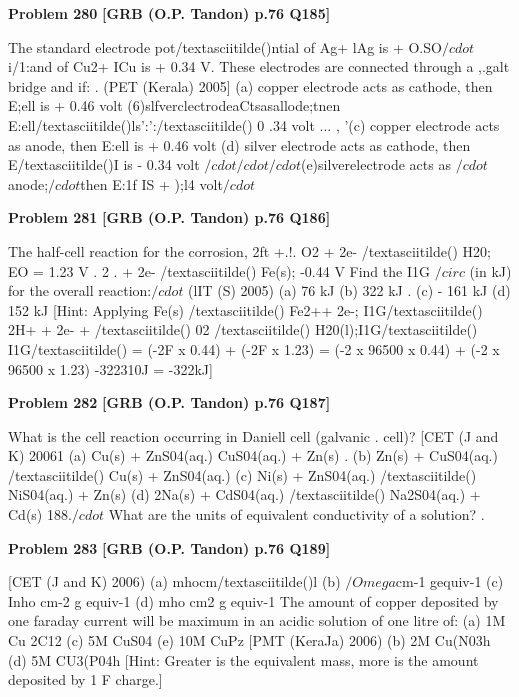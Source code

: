 \begin{problembox}
\textbf{Problem 280} \hfill \textbf{[GRB (O.P. Tandon) p.76 Q185]}
\label{q:ext-grb_all_questions-280}

The standard electrode pot/textasciitilde()ntial of Ag+ lAg is + O.SO$/cdot$i/1:and of 
Cu2+ ICu is + 0.34 V. These electrodes are connected through a 
,.galt bridge and if: 
. (PET (Kerala) 2005] 
(a) copper electrode acts as cathode, then E;ell is + 0.46 volt 
(6)slfverclectrodeaCtsasallode;tnen E:ell/textasciitilde()ls':':/textasciitilde() 0 .34 volt ... 
, '(c) copper electrode acts as anode, then E:ell is + 0.46 volt 
(d) silver electrode acts as cathode, then E/textasciitilde()I is - 0.34 volt 
$/cdot$$/cdot$$/cdot$(e)silverelectrode acts as $/cdot$anode;$/cdot$then E:1f IS + );l4 volt$/cdot$
\end{problembox}

\begin{problembox}
\textbf{Problem 281} \hfill \textbf{[GRB (O.P. Tandon) p.76 Q186]}
\label{q:ext-grb_all_questions-281}

The half-cell reaction for the corrosion, 
2ft +.!. O2 + 2e- /textasciitilde() 
H20; 
EO = 1.23 V 
. 2 . 
+ 2e- /textasciitilde() 
Fe(s); 
-0.44 V 
Find the I1G $/circ$ (in kJ) for the overall reaction:$/cdot$ (lIT (S) 2005) 
(a) 
76 kJ 
(b) 
322 kJ . (c) - 161 kJ 
(d) 
152 kJ 
[Hint: 
Applying 
Fe(s) /textasciitilde() 
Fe2++ 2e-; I1G/textasciitilde() 
2H+ + 2e- + /textasciitilde() 02 /textasciitilde() 
H20(l);I1G/textasciitilde() 
I1G/textasciitilde() = (-2F x 0.44) + (-2F x 1.23) 
= (-2 x 96500 x 0.44) + (-2 x 96500 x 1.23) 
-322310J = -322kJ]
\end{problembox}

\begin{problembox}
\textbf{Problem 282} \hfill \textbf{[GRB (O.P. Tandon) p.76 Q187]}
\label{q:ext-grb_all_questions-282}

What is the cell reaction occurring in Daniell cell (galvanic . 
cell)? 
[CET (J and K) 20061 
(a) Cu(s) + ZnS04(aq.) 
CuS04(aq.) + Zn(s) 
. (b) Zn(s) + CuS04(aq.) /textasciitilde() 
Cu(s) + ZnS04(aq.) 
(c) Ni(s) + ZnS04(aq.) /textasciitilde() 
NiS04(aq.) + Zn(s) 
(d) 2Na(s) + CdS04(aq.) /textasciitilde() 
Na2S04(aq.) + Cd(s) 
188.$/cdot$ What are the units of equivalent conductivity of a solution? 
.
\end{problembox}

\begin{problembox}
\textbf{Problem 283} \hfill \textbf{[GRB (O.P. Tandon) p.76 Q189]}
\label{q:ext-grb_all_questions-283}

[CET (J and K) 2006) 
(a) mhocm/textasciitilde()l 
(b) $/Omega$cm-1 gequiv-1 
(c) Inho cm-2 g equiv-1 
(d) mho cm2 g equiv-1 
The amount of copper deposited by one faraday current will be 
maximum in an acidic solution of one litre of: 
(a) 1M Cu 2C12 
(c) 5M CuS04 
(e) 10M CuPz 
[PMT (KeraJa) 2006) 
(b) 2M Cu(N03h 
(d) 5M CU3(P04h 
[Hint: 
Greater is the equivalent mass, more is the amount 
deposited by 1 F charge.]
\end{problembox}

